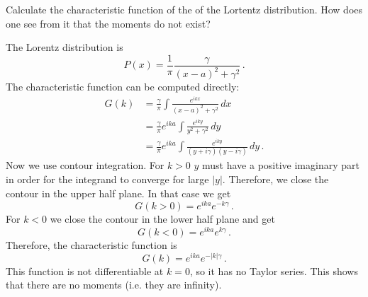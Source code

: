 

Calculate the characteristic function of the of the Lortentz distribution.
How does one see from it that the moments do not exist?


The Lorentz distribution is
\begin{equation*}
P(x) = \frac{1}{\pi} \frac{\gamma}{(x - a)^2 + \gamma^2} \, .
\end{equation*}
The characteristic function can be computed directly:
\begin{align*}
G(k)
&= \frac{\gamma}{\pi} \int \frac{e^{i k x}}{(x - a)^2 + \gamma^2} \, dx \\
&= \frac{\gamma}{\pi} e^{i k a} \int \frac{e^{i k y}}{y^2 + \gamma^2} \, dy \\
&= \frac{\gamma}{\pi} e^{i k a} \int \frac{e^{i k y}}{(y + i\gamma)(y - i\gamma)} \, dy \, .
\end{align*}
Now we use contour integration.
For $k > 0$ $y$ must have a positive imaginary part in order for the integrand to converge for large $|y|$.
Therefore, we close the contour in the upper half plane.
In that case we get
\begin{equation*}
G(k > 0) = e^{i k a} e^{-k \gamma} \, .
\end{equation*}
For $k<0$ we close the contour in the lower half plane and get
\begin{equation*}
G(k < 0) = e^{i k a} e^{k \gamma} \, .
\end{equation*}
Therefore, the characteristic function is
\begin{equation*}
G(k) = e^{i k a} e^{-|k| \gamma} \, .
\end{equation*}
This function is not differentiable at $k=0$, so it has no Taylor series.
This shows that there are no moments (i.e. they are infinity).
